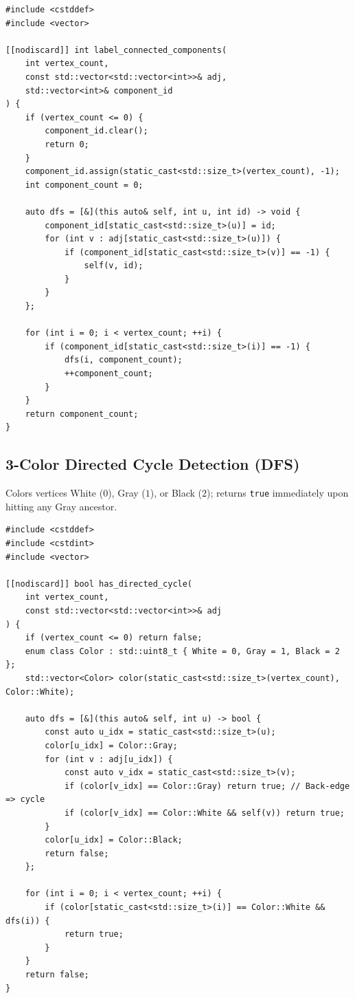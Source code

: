 \documentclass[11pt,a4paper]{article}
\theoremstyle{definition}
\begin{document}
\begin{lstlisting}[caption={Connected component labeling via DFS}]
#include <cstddef>
#include <vector>

[[nodiscard]] int label_connected_components(
    int vertex_count,
    const std::vector<std::vector<int>>& adj,
    std::vector<int>& component_id
) {
    if (vertex_count <= 0) {
        component_id.clear();
        return 0;
    }
    component_id.assign(static_cast<std::size_t>(vertex_count), -1);
    int component_count = 0;

    auto dfs = [&](this auto& self, int u, int id) -> void {
        component_id[static_cast<std::size_t>(u)] = id;
        for (int v : adj[static_cast<std::size_t>(u)]) {
            if (component_id[static_cast<std::size_t>(v)] == -1) {
                self(v, id);
            }
        }
    };

    for (int i = 0; i < vertex_count; ++i) {
        if (component_id[static_cast<std::size_t>(i)] == -1) {
            dfs(i, component_count);
            ++component_count;
        }
    }
    return component_count;
}
\end{lstlisting}

\subsection{3-Color Directed Cycle Detection (DFS)}
Colors vertices White ($0$), Gray ($1$), or Black ($2$); returns \texttt{true} immediately upon hitting any Gray ancestor.

\begin{lstlisting}[caption={Directed cycle detection using 3-color DFS}]
#include <cstddef>
#include <cstdint>
#include <vector>

[[nodiscard]] bool has_directed_cycle(
    int vertex_count,
    const std::vector<std::vector<int>>& adj
) {
    if (vertex_count <= 0) return false;
    enum class Color : std::uint8_t { White = 0, Gray = 1, Black = 2 };
    std::vector<Color> color(static_cast<std::size_t>(vertex_count), Color::White);

    auto dfs = [&](this auto& self, int u) -> bool {
        const auto u_idx = static_cast<std::size_t>(u);
        color[u_idx] = Color::Gray;
        for (int v : adj[u_idx]) {
            const auto v_idx = static_cast<std::size_t>(v);
            if (color[v_idx] == Color::Gray) return true; // Back-edge => cycle
            if (color[v_idx] == Color::White && self(v)) return true;
        }
        color[u_idx] = Color::Black;
        return false;
    };

    for (int i = 0; i < vertex_count; ++i) {
        if (color[static_cast<std::size_t>(i)] == Color::White && dfs(i)) {
            return true;
        }
    }
    return false;
}
\end{lstlisting}
\end{document}
